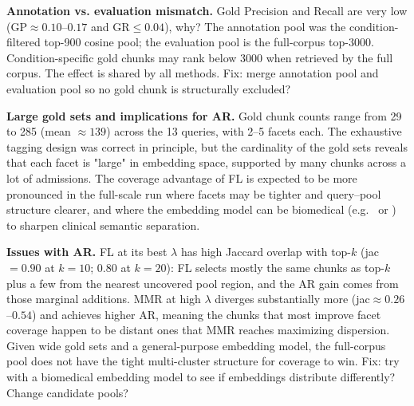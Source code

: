 \documentclass[11pt,a4paper]{article}
\newcommand{\fname}[1]{\path{#1}}
\begin{document}
\textbf{Annotation vs. evaluation mismatch.} Gold Precision and Recall are very low (GP$\approx 0.10$--$0.17$ and GR$\leq 0.04$), why? The annotation pool was the condition-filtered top-900 cosine pool; the evaluation pool is the full-corpus top-3000. Condition-specific gold chunks may rank below 3000 when retrieved by the full corpus. The effect is shared by all methods. Fix: merge annotation pool and evaluation pool so no gold chunk is structurally excluded?

\textbf{Large gold sets and implications for AR.} Gold chunk counts range from 29 to 285 (mean $\approx 139$) across the 13 queries, with 2--5 facets each. The exhaustive tagging design was correct in principle, but the cardinality of the gold sets reveals that each facet is "large" in embedding space, supported by many chunks across a lot of admissions. The coverage advantage of FL is expected to be more pronounced in the full-scale run where facets may be tighter and query--pool structure clearer, and where the embedding model can be biomedical (e.g.\ \fname{BioBERT} or \fname{MedCPT}) to sharpen clinical semantic separation.

\textbf{Issues with AR.} FL at its best $\lambda$ has high Jaccard overlap with top-$k$ (jac$=0.90$ at $k=10$; $0.80$ at $k=20$): FL selects mostly the same chunks as top-$k$ plus a few from the nearest uncovered pool region, and the AR gain comes from those marginal additions. MMR at high $\lambda$ diverges substantially more (jac$\approx 0.26$--$0.54$) and achieves higher AR, meaning the chunks that most improve facet coverage happen to be distant ones that MMR reaches maximizing dispersion. Given wide gold sets and a general-purpose embedding model, the full-corpus pool does not have the tight multi-cluster structure for coverage to win. Fix: try with a biomedical embedding model to see if embeddings distribute differently? Change candidate pools?
\end{document}
